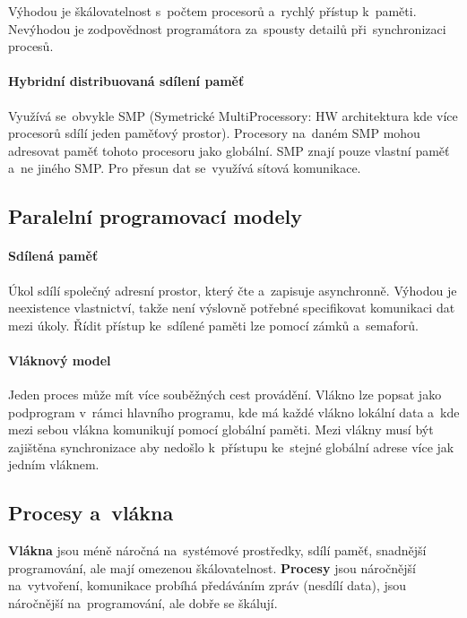 Výhodou je škálovatelnost s~počtem procesorů a~rychlý přístup k~paměti. Nevýhodou je zodpovědnost programátora za~spousty detailů při~synchronizaci procesů.

\paragraph{Hybridní distribuovaná sdílení paměť}

Využívá se~obvykle SMP (Symetrické MultiProcessory: HW architektura kde více procesorů sdílí jeden paměťový prostor). Procesory na~daném SMP mohou adresovat paměť tohoto procesoru jako globální. SMP znají pouze vlastní paměť a~ne jiného SMP. Pro přesun dat se~využívá sítová komunikace.

\subsection{Paralelní programovací modely}

\paragraph{Sdílená paměť}

Úkol sdílí společný adresní prostor, který čte a~zapisuje asynchronně. Výhodou je neexistence vlastnictví, takže není výslovně potřebné specifikovat komunikaci dat mezi úkoly. Řídit přístup ke~sdílené paměti lze pomocí zámků a~semaforů.

\paragraph{Vláknový model}

Jeden proces může mít více souběžných cest provádění. Vlákno lze popsat jako podprogram v~rámci hlavního programu, kde má každé vlákno lokální data a~kde mezi sebou vlákna komunikují pomocí globální paměti. Mezi vlákny musí být zajištěna synchronizace aby nedošlo k~přístupu ke~stejné globální adrese více jak jedním vláknem.

\subsection{Procesy a~vlákna}

\textbf{Vlákna} jsou méně náročná na~systémové prostředky, sdílí paměť, snadnější programování, ale mají omezenou škálovatelnost. \textbf{Procesy} jsou náročnější na~vytvoření, komunikace probíhá předáváním zpráv (nesdílí data), jsou náročnější na~programování, ale dobře se škálují.

